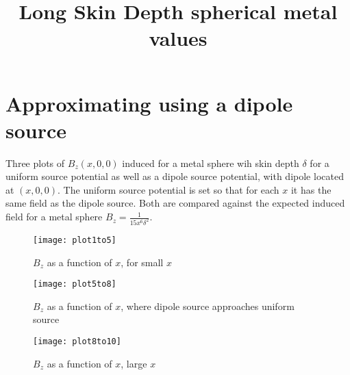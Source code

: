 \documentclass[11pt]{article}
\title{Long Skin Depth spherical metal values}
\date{}
\author{}
\begin{document}
\graphicspath{{figures/}}

\maketitle

\section{Approximating using a dipole source}\label{sec:spheredipolesource}

Three plots of $B_z(x, 0, 0)$ induced for a metal sphere wih skin depth $\delta$ for a uniform source potential as well
as a dipole source potential, with dipole located at $(x, 0, 0)$.
The uniform source potential is set so that for each $x$ it has the same field as the dipole source.
Both are compared against the expected induced field for a metal sphere $B_z = \frac{1}{15 x^6 \delta^2}$.

\begin{figure}[htp]
	\centering
	\texttt{[image: plot1to5]}
	\caption{$B_z$ as a function of $x$, for small $x$ \label{fig:plotx1to5}}
\end{figure}

\begin{figure}[htp]
	\centering
	\texttt{[image: plot5to8]}
	\caption{$B_z$ as a function of $x$, where dipole source approaches uniform source \label{fig:plotx5to8}}
\end{figure}

\begin{figure}[htp]
	\centering
	\texttt{[image: plot8to10]}
	\caption{$B_z$ as a function of $x$, large $x$ \label{fig:plotx8to10}}
\end{figure}
\end{document}
